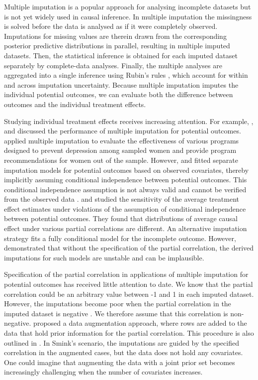 	Multiple imputation is a popular approach for analysing incomplete datasets but is not yet widely used in causal inference. In multiple imputation the missingness is solved before the data is analysed as if it were completely observed. Imputations for missing values are therein drawn from the corresponding posterior predictive distributions in parallel, resulting in multiple imputed datasets. Then, the statistical inference is obtained for each imputed dataset separately by complete-data analyses. Finally, the multiple analyses are aggregated into a single inference using Rubin's rules \citep[pp. 76]{RubinD1987}, which account for within and across imputation uncertainty. Because multiple imputation imputes the individual potential outcomes, we can evaluate both the difference between outcomes and the individual treatment effects. 
	
	Studying individual treatment effects receives increasing attention. For example, \citet{lamont2018identification}, and \citet{westreich2015imputation} discussed the performance of multiple imputation for potential outcomes. \citet{lamont2018identification} applied multiple imputation to evaluate the effectiveness of various programs designed to prevent depression among sampled women and provide program recommendations for women out of the sample. However, \citet{lamont2018identification} and \citet{westreich2015imputation} fitted separate imputation models for potential outcomes based on observed covariates, thereby implicitly assuming conditional independence between potential outcomes. This conditional independence assumption is not always valid and cannot be verified from the observed data \citep{rassler2012statistical}. \citet{imbens2015causal} and \citet{gadbury2001evaluating} studied the sensitivity of the average treatment effect estimates under violations of the assumption of conditional independence between potential outcomes. They found that distributions of average causal effect under various partial correlations are different. An alternative imputation strategy fits a fully conditional model for the incomplete outcome. However, \citet{Buuren2018} demonstrated that without the specification of the partial correlation, the derived imputations for such models are unstable and can be implausible. 
	
	Specification of the partial correlation in applications of multiple imputation for potential outcomes has received little attention to date. We know that the partial correlation could be an arbitrary value between -1 and 1 in each imputed dataset. However, the imputations become poor when the partial correlation in the imputed dataset is negative \citep[Section 8.4.1]{Buuren2018}. We therefore assume that this correlation is non-negative. \citet{smink2016towards} proposed a data augmentation approach, where rows are added to the data that hold prior information for the partial correlation. This procedure is also outlined in \citep[Section 8.4.2]{Buuren2018}. In Smink's scenario, the imputations are guided by the specified correlation in the augmented cases, but the data does not hold any covariates. One could imagine that augmenting the data with a joint prior set becomes increasingly challenging when the number of covariates increases. 
	
